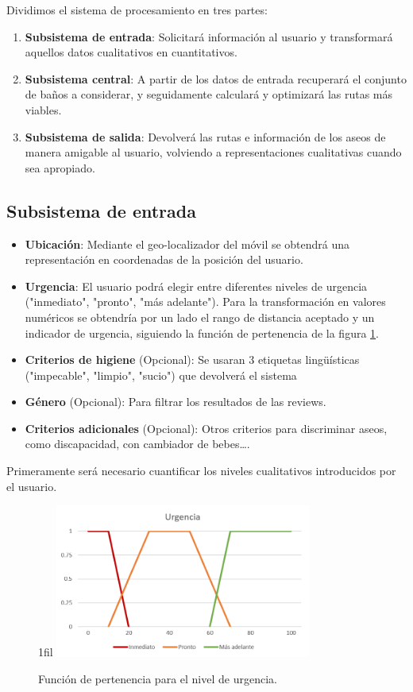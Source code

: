 \documentclass[13pt,a4paper]{article}
\makeatletter
\newcommand*{\centerfloat}{%
  \parindent \z@
  \leftskip \z@ \@plus 1fil \@minus \textwidth
  \rightskip\leftskip
  \parfillskip \z@skip}
\makeatother
\begin{document}
Dividimos el sistema de procesamiento en tres partes:
\begin{enumerate}
  \item \textbf{Subsistema de entrada}: Solicitará información al usuario y transformará aquellos datos cualitativos en cuantitativos.
  \item \textbf{Subsistema central}: A partir de los datos de entrada recuperará el conjunto de baños a considerar, y seguidamente calculará y optimizará las rutas más viables.
  \item \textbf{Subsistema de salida}: Devolverá las rutas e información de los aseos de manera amigable al usuario, volviendo a representaciones cualitativas cuando sea apropiado.
\end{enumerate}

\subsection{Subsistema de entrada}

\begin{itemize}
  \item \textbf{Ubicación}: Mediante el geo-localizador del móvil se obtendrá una representación en coordenadas de la posición del usuario.
  \item \textbf{Urgencia}: El usuario podrá elegir entre diferentes niveles de urgencia ("inmediato", "pronto", "más adelante"). Para la transformación en valores numéricos se obtendría por un lado el rango de distancia aceptado y un indicador de urgencia, siguiendo la función de pertenencia de la figura \ref{urgencia}.
  \item \textbf{Criterios de higiene} (Opcional): Se usaran 3 etiquetas lingüísticas ("impecable", "limpio", "sucio") que devolverá el sistema
  \item \textbf{Género} (Opcional): Para filtrar los resultados de las reviews.
  \item \textbf{Criterios adicionales} (Opcional): Otros criterios para discriminar aseos, como discapacidad, con cambiador de bebes\dots.
\end{itemize}

Primeramente será necesario cuantificar los niveles cualitativos introducidos por el usuario.

\begin{figure}[H]
  \centerfloat
  \includegraphics[width=0.75\textwidth]{img/1.png}
  \caption{Función de pertenencia para el nivel de urgencia.}
  \label{urgencia}
\end{figure}
\end{document}
